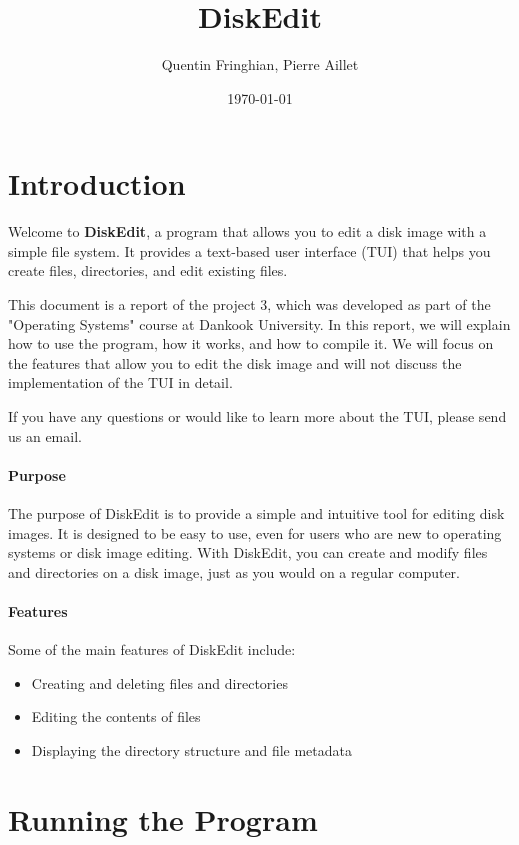 \documentclass{article}
\begin{document}
\title{DiskEdit}
\author{Quentin Fringhian, Pierre Aillet}
\date{\today}
\maketitle

\tableofcontents
\clearpage

\section{Introduction}

Welcome to \textbf{DiskEdit}, a program that allows you to edit a disk image with a simple file system. It provides a text-based user interface (TUI) that helps you create files, directories, and edit existing files.

This document is a report of the project 3, which was developed as part of the "Operating Systems" course at Dankook University. In this report, we will explain how to use the program, how it works, and how to compile it. We will focus on the features that allow you to edit the disk image and will not discuss the implementation of the TUI in detail.

If you have any questions or would like to learn more about the TUI, please send us an email.

\paragraph{Purpose}
The purpose of DiskEdit is to provide a simple and intuitive tool for editing disk images. It is designed to be easy to use, even for users who are new to operating systems or disk image editing. With DiskEdit, you can create and modify files and directories on a disk image, just as you would on a regular computer.

\paragraph{Features}
Some of the main features of DiskEdit include:
\begin{itemize}
    \item Creating and deleting files and directories
    \item Editing the contents of files
    \item Displaying the directory structure and file metadata
\end{itemize}

\section{Running the Program}
\end{document}
